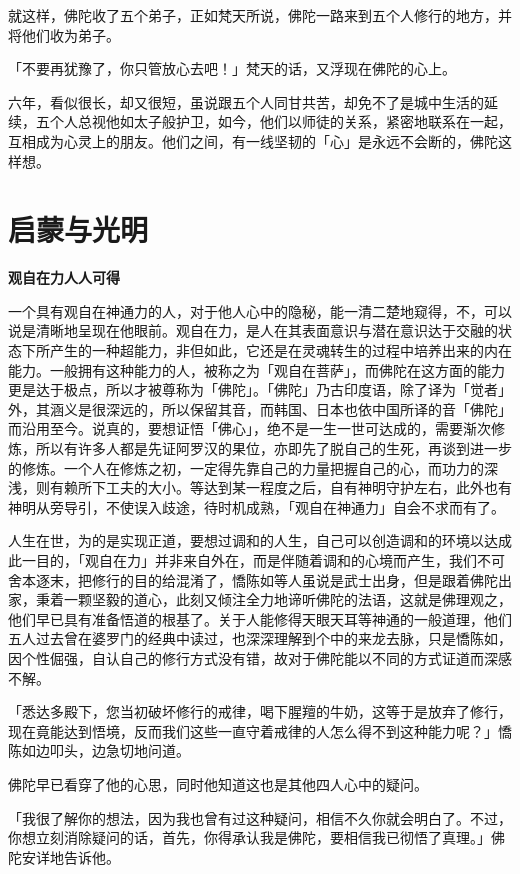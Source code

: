 \documentclass[twoside,openany]{book}
\newcommand{\mt}[1]{\textbullet \textbf{#1}}
\begin{document}
就这样，佛陀收了五个弟子，正如梵天所说，佛陀一路来到五个人修行的地方，并将他们收为弟子。

「不要再犹豫了，你只管放心去吧！」梵天的话，又浮现在佛陀的心上。

六年，看似很长，却又很短，虽说跟五个人同甘共苦，却免不了是城中生活的延续，五个人总视他如太子般护卫，如今，他们以师徒的关系，紧密地联系在一起，互相成为心灵上的朋友。他们之间，有一线坚韧的「心」是永远不会断的，佛陀这样想。

\section{启蒙与光明}\label{sec2.5}

\mt{观自在力人人可得}

一个具有观自在神通力的人，对于他人心中的隐秘，能一清二楚地窥得，不，可以说是清晰地呈现在他眼前。观自在力，是人在其表面意识与潜在意识达于交融的状态下所产生的一种超能力，非但如此，它还是在灵魂转生的过程中培养出来的内在能力。一般拥有这种能力的人，被称之为「观自在菩萨」，而佛陀在这方面的能力更是达于极点，所以才被尊称为「佛陀」。「佛陀」乃古印度语，除了译为「觉者」外，其涵义是很深远的，所以保留其音，而韩国、日本也依中国所译的音「佛陀」而沿用至今。说真的，要想证悟「佛心」，绝不是一生一世可达成的，需要渐次修炼，所以有许多人都是先证阿罗汉的果位，亦即先了脱自己的生死，再谈到进一步的修炼。一个人在修炼之初，一定得先靠自己的力量把握自己的心，而功力的深浅，则有赖所下工夫的大小。等达到某一程度之后，自有神明守护左右，此外也有神明从旁导引，不使误入歧途，待时机成熟，「观自在神通力」自会不求而有了。

人生在世，为的是实现正道，要想过调和的人生，自己可以创造调和的环境以达成此一目的，「观自在力」并非来自外在，而是伴随着调和的心境而产生，我们不可舍本逐末，把修行的目的给混淆了，憍陈如等人虽说是武士出身，但是跟着佛陀出家，秉着一颗坚毅的道心，此刻又倾注全力地谛听佛陀的法语，这就是佛理观之，他们早已具有准备悟道的根基了。关于人能修得天眼天耳等神通的一般道理，他们五人过去曾在婆罗门的经典中读过，也深深理解到个中的来龙去脉，只是憍陈如，因个性倔强，自认自己的修行方式没有错，故对于佛陀能以不同的方式证道而深感不解。

「悉达多殿下，您当初破坏修行的戒律，喝下腥羶的牛奶，这等于是放弃了修行，现在竟能达到悟境，反而我们这些一直守着戒律的人怎么得不到这种能力呢？」憍陈如边叩头，边急切地问道。

佛陀早已看穿了他的心思，同时他知道这也是其他四人心中的疑问。

「我很了解你的想法，因为我也曾有过这种疑问，相信不久你就会明白了。不过，你想立刻消除疑问的话，首先，你得承认我是佛陀，要相信我已彻悟了真理。」佛陀安详地告诉他。
\end{document}
